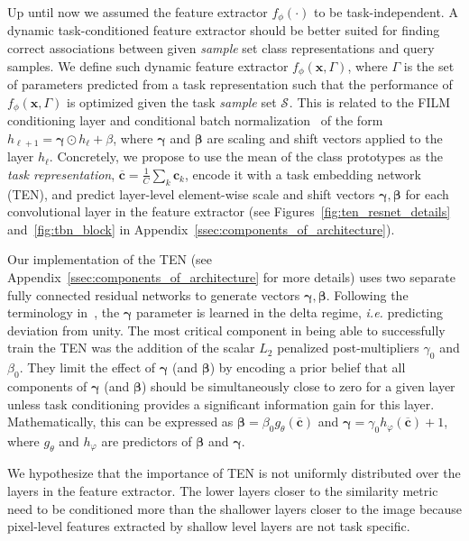 \documentclass{article}
\renewcommand{\vec}[1]{\mathbf{#1}}
\newcommand{\examples}[1]{\mathcal{S}_{#1}}
\begin{document}
Up until now we assumed the feature extractor $f_{\phi}(\cdot)$ to be task-independent. A dynamic task-conditioned feature extractor should be better suited for finding correct associations between given \emph{sample} set class representations and query samples. We define such dynamic feature extractor $f_{\phi}(\vec{x}, \Gamma)$, where $\Gamma$ is the set of parameters predicted from a task representation such that the performance of $f_{\phi}(\vec{x}, \Gamma)$ is optimized given the task \emph{sample} set $\examples{}$. This is related to the FILM conditioning layer \citep{perez2017film} and conditional batch normalization~\citep{Dumoulin2017learned,Perez2017LearningVR} of the form $h_{\ell+1} = \bm{\gamma} \odot h_{\ell} + \beta$, where $\bm{\gamma}$ and $\bm{\beta}$ are scaling and shift vectors applied to the layer $h_{\ell}$. Concretely, we propose to use the mean of the class prototypes as the \emph{task representation}, $\overline{\vec{c}} = \frac{1}{C}\sum_k \vec{c}_k$, encode it with a task embedding network (TEN), and predict layer-level element-wise scale and shift vectors $\bm{\gamma}, \bm{\beta}$ for each convolutional layer in the feature extractor (see Figures~\ref{fig:ten_resnet_details} and~\ref{fig:tbn_block} in Appendix~\ref{ssec:components_of_architecture}). 
 
Our implementation of the TEN (see Appendix~\ref{ssec:components_of_architecture} for more details) uses two separate fully connected residual networks to generate vectors $\bm{\gamma}, \bm{\beta}$. Following the terminology in~\citep{Perez2017LearningVR}, the $\bm{\gamma}$ parameter is learned in the delta regime, \emph{i.e.} predicting deviation from unity. The most critical component in being able to successfully train the TEN was the addition of the scalar $L_2$ penalized post-multipliers $\gamma_0$ and $\beta_0$. They limit the effect of $\bm{\gamma}$ (and $\bm{\beta}$) by encoding a prior belief that all components of $\bm{\gamma}$  (and $\bm{\beta}$) should be simultaneously close to zero for a given layer unless task conditioning provides a significant information gain for this layer. Mathematically, this can be expressed as $\bm{\beta} = \beta_0 g_{\theta}(\overline{\vec{c}})$ and $\bm{\gamma} = \gamma_0 h_{\varphi}(\overline{\vec{c}}) + 1$, where $g_{\theta}$ and $h_{\varphi}$ are predictors of $\bm{\beta}$ and $\bm{\gamma}$.

We hypothesize that the importance of TEN is not uniformly distributed over the layers in the feature extractor. The lower layers closer to the similarity metric need to be conditioned more than the shallower layers closer to the image because pixel-level features extracted by shallow level layers are not task specific. 
\end{document}
